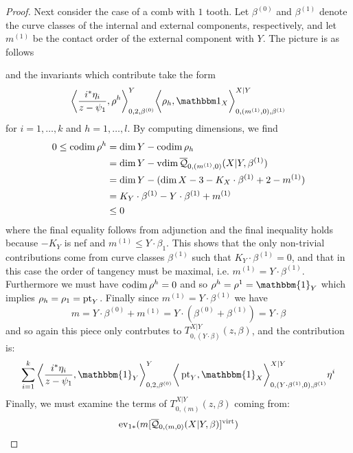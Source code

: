 \begin{proof}
Next consider the case of a comb with $1$ tooth. Let $\beta^{(0)}$ and $\beta^{(1)}$ denote the curve classes of the internal and external components, respectively, and let $m^{(1)}$ be the contact order of the external component with $Y$. The picture is as follows
\begin{center}

\end{center}
and the invariants which contribute take the form
\begin{equation*} \bigg\langle \dfrac{i^*\eta_i}{z-\psi_1},\rho^h\bigg\rangle_{0,2,\beta^{(0)}}^Y \bigg\langle \rho_h, \mathbbm 1_{X}\bigg\rangle_{0,(m^{(1)},0),\beta^{(1)}}^{X|Y} \end{equation*}
for $i = 1, \ldots, k$ and $h = 1, \ldots, l$. By computing dimensions, we find
\begin{align*}
0\leq \operatorname{codim} \rho^h &= \dim Y-\operatorname{codim} \rho_h \\
&= \dim Y-\operatorname{vdim} \overline{\mathcal Q}_{0,(m^{(1)},0)}(X|Y,\beta^{(1)}) \\
&= \dim Y-(\dim X-3-K_{X}\cdot \beta^{(1)}+2-m^{(1)})\\
&= K_Y \cdot \beta^{(1)} - Y \cdot \beta^{(1)}+m^{(1)} \\
&\leq 0
\end{align*}
where the final equality follows from adjunction and the final inequality holds because $-K_Y$ is nef and $m^{(1)}\leq Y \cdot \beta_1$. This shows that the only non-trivial contributions come from curve classes $\beta^{(1)}$ such that $K_Y \cdot \beta^{(1)}=0$, and that in this case the order of tangency must be maximal, i.e. $m^{(1)}=Y \cdot \beta^{(1)}$. Furthermore we must have $\operatorname{codim} \rho^h = 0$ and so $\rho^h = \rho^1 = \mathbbm{1}_Y$ which implies $\rho_h = \rho_1 = \operatorname{pt}_Y$. Finally since $m^{(1)}=Y \cdot \beta^{(1)}$ we have
\begin{equation*} m = Y \cdot \beta^{(0)}+m^{(1)}=Y \cdot (\beta^{(0)} + \beta^{(1)}) = Y \cdot \beta \end{equation*}
and so again this piece only contrbutes to $T_{0,(Y\cdot\beta)}^{X|Y}(z,\beta)$, and the contribution is:
\begin{equation*} \sum_{i = 1}^{k} \bigg\langle \dfrac{i^*\eta_i}{z-\psi_1}, \mathbbm{1}_Y \bigg\rangle_{0,2,\beta^{(0)}}^Y \bigg\langle \pt_Y, \mathbbm{1}_X \bigg\rangle_{0,(Y \cdot \beta^{(1)},0),\beta^{(1)}}^{X|Y}\eta^i\end{equation*}
Finally, we must examine the terms of $T_{0,(m)}^{X|Y}(z,\beta)$ coming from:
\begin{equation*}\operatorname{ev}_{1*}(m[\overline{\mathcal Q}_{0,(m,0)}(X|Y,\beta)]^{\operatorname{virt}})\end{equation*} 

\end{proof}
